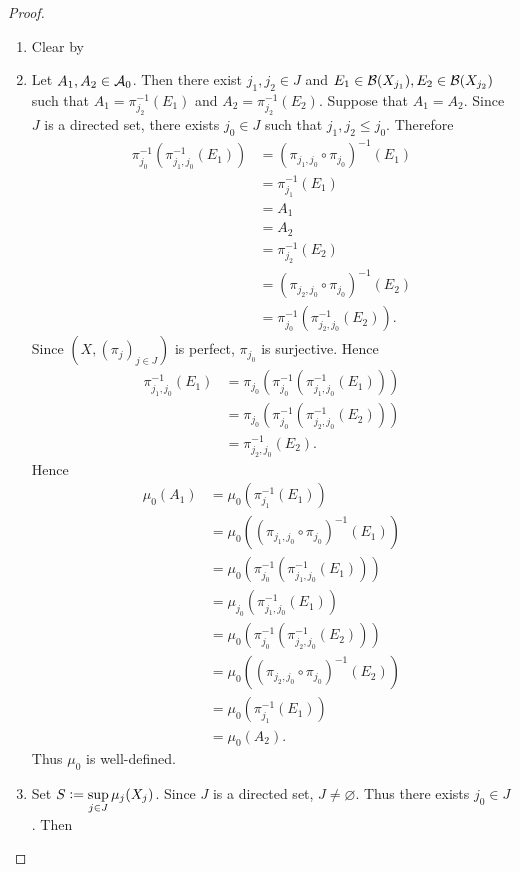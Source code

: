 \documentclass{book}
\begin{document}
\begin{proof}\
	\begin{enumerate}
		\item Clear by 
		\item Let $A_1, A_2 \in \mathcal{A}_0$. Then there exist $j_1, j_2 \in J$ and $E_1 \in \mathcal{B}(X_{j_1}) , E_2 \in \mathcal{B}(X_{j_2})$ such that $A_1 = \pi_{j_2}^{-1}(E_1)$ and $A_2 = \pi_{j_2}^{-1}(E_2)$. Suppose that $A_1 = A_2$. Since $J$ is a directed set, there exists $j_0 \in J$ such that $j_1, j_2 \leq j_0$. Therefore 
		\begin{align*}
			\pi_{j_0}^{-1}(\pi_{j_1, j_0}^{-1}(E_1)) 
			& = (\pi_{j_1, j_0} \circ \pi_{j_0})^{-1}(E_1) \\
			& = \pi_{j_1}^{-1}(E_1) \\
			& = A_1 \\
			& = A_2 \\
			& = \pi_{j_2}^{-1}(E_2) \\
			& = (\pi_{j_2, j_0} \circ \pi_{j_0})^{-1}(E_2) \\
			& = \pi_{j_0}^{-1}(\pi_{j_2, j_0}^{-1}(E_2)).
		\end{align*}
		Since $(X, (\pi_j)_{j \in J})$ is perfect, $\pi_{j_0}$ is surjective. Hence 
		\begin{align*}
			\pi_{j_1, j_0}^{-1}(E_1)
			& = \pi_{j_0}(\pi_{j_0}^{-1}(\pi_{j_1, j_0}^{-1}(E_1))) \\
			& = \pi_{j_0}(\pi_{j_0}^{-1}(\pi_{j_2, j_0}^{-1}(E_2))) \\
			& = \pi_{j_2, j_0}^{-1}(E_2).
		\end{align*} 
		Hence 
		\begin{align*}
			\mu_0(A_1)
			& = \mu_0(\pi_{j_1}^{-1}(E_1)) \\
			& = \mu_0((\pi_{j_1, j_0} \circ \pi_{j_0})^{-1}(E_1)) \\
			& = \mu_0(\pi_{j_0}^{-1}(\pi_{j_1, j_0}^{-1}(E_1))) \\
			& = \mu_{j_0}(\pi_{j_1, j_0}^{-1}(E_1)) \\
			& = \mu_0(\pi_{j_0}^{-1}(\pi_{j_2, j_0}^{-1}(E_2))) \\
			& = \mu_0((\pi_{j_2, j_0} \circ \pi_{j_0})^{-1}(E_2)) \\
			& = \mu_0(\pi_{j_1}^{-1}(E_1)) \\
			& = \mu_0(A_2).
		\end{align*}
		Thus $\mu_0$ is well-defined.
		\item Set $S \vcentcolon= \sup\limits_{j \in J} \mu_j(X_j)$.  Since $J$ is a directed set, $J \neq \varnothing$. Thus there exists $j_0 \in J$. Then

\end{enumerate}
\end{proof}
\end{document}
